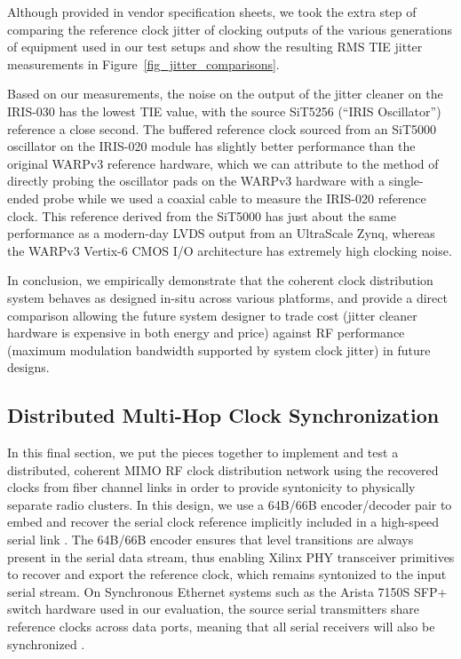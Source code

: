 Although provided in vendor specification sheets, we took the extra step of comparing the reference clock jitter of clocking outputs of the various generations of equipment used in our test setups and show the resulting \ac{RMS} \ac{TIE} jitter measurements in Figure~\ref{fig_jitter_comparisons}.

Based on our measurements, the noise on the output of the jitter cleaner on the IRIS-030 has the lowest \ac{TIE} value, with the source SiT5256 (``IRIS Oscillator'') reference a close second.
The buffered reference clock sourced from an SiT5000 oscillator on the IRIS-020 module has slightly better performance than the original WARPv3 reference hardware, which we can attribute to the method of directly probing the oscillator pads on the WARPv3 hardware with a single-ended probe while we used a coaxial cable to measure the IRIS-020 reference clock.
This reference derived from the SiT5000 has just about the same performance as a modern-day \ac{LVDS} output from an UltraScale Zynq, whereas the WARPv3 Vertix-6 CMOS I/O architecture has extremely high clocking noise.

In conclusion, we empirically demonstrate that the coherent clock distribution system behaves as designed in-situ across various platforms, and provide a direct comparison allowing the future system designer to trade cost (jitter cleaner hardware is expensive in both energy and price) against RF performance (maximum modulation bandwidth supported by system clock jitter) in future designs.


\subsection{Distributed Multi-Hop Clock Synchronization}
\label{sec_clk_sfp}

In this final section, we put the pieces together to implement and test a distributed, coherent \ac{MIMO} RF clock distribution network using the recovered clocks from fiber channel links in order to provide syntonicity to physically separate radio clusters.
In this design, we use a 64B/66B encoder/decoder pair to embed and recover the serial clock reference implicitly included in a high-speed serial link \cite{toyoda2010100gbe}.
The 64B/66B encoder ensures that level transitions are always present in the serial data stream, thus enabling Xilinx \ac{PHY} transceiver primitives to recover and export the reference clock, which remains syntonized to the input serial stream.
On Synchronous Ethernet systems such as the Arista 7150S SFP+ switch hardware used in our evaluation, the source serial transmitters share reference clocks across data ports, meaning that all serial receivers will also be synchronized \cite{rec2007g}.

